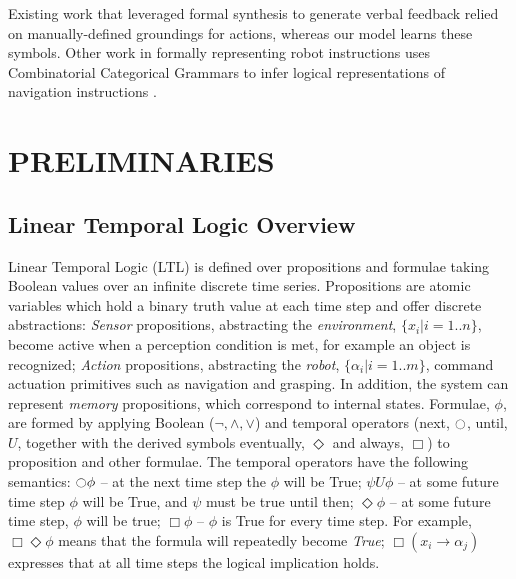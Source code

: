 \documentclass[letterpaper]{article} %
\begin{document}
Existing work that leveraged formal synthesis to generate verbal feedback \cite{raman2013sorry} relied on manually-defined groundings for actions, whereas our model learns these symbols. Other work in formally representing robot instructions uses Combinatorial Categorical Grammars to infer logical representations of navigation instructions \cite{matuszek2013learning}.

\section{PRELIMINARIES}\label{sec:prelim}

\subsection{Linear Temporal Logic Overview}\label{sec:prelim_ltl}
Linear Temporal Logic (LTL) is defined over propositions and formulae taking Boolean values over an infinite discrete time series. Propositions are atomic variables which hold a binary truth value at each time step and offer discrete abstractions: \textit{Sensor} propositions, abstracting the \textit{environment}, $\{x_i | i=1..n\}$, become active when a perception condition is met, for example an object is recognized; \textit{Action} propositions, abstracting the \textit{robot}, $\{\alpha_i | i=1..m\}$, command actuation primitives such as navigation and grasping. In addition, the system can represent \textit{memory} propositions, which correspond to internal states.
Formulae, $\phi$, are formed by applying Boolean ($\neg, \land, \lor$) and temporal operators (next, $\ocircle$, until, $U$, together with the derived symbols eventually, $\Diamond$ and always, $\Box$) to proposition and other formulae. The temporal operators have the following semantics: $\ocircle \phi$ -- at the next time step the $\phi$ will be True; $\psi U \phi$ -- at some future time step $\phi$ will be True, and $\psi$ must be true until then; $\Diamond \phi$ -- at some future time step, $\phi$ will be true; $\Box \phi$ -- $\phi$ is True for every time step.
For example, $\Box \Diamond \phi$ means that the formula will repeatedly become \textit{True}; $\Box ( x_i \to \alpha_j )$ expresses that at all time steps the logical implication holds.
\end{document}
